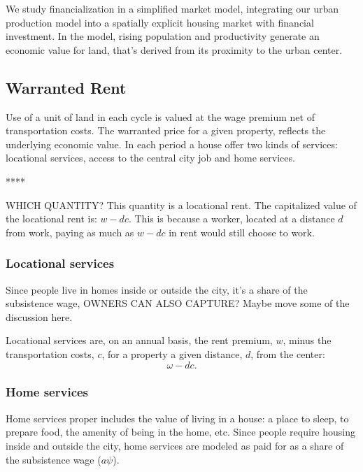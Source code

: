 We study \gls{financialization} in a simplified market model, integrating
our urban production model  into a spatially explicit {housing market} with financial investment. %
In the model, rising \gls{population} and \gls{productivity} generate an economic value for land, that's derived from its proximity to the \gls{urban center}. 


\subsection{Warranted Rent} \label{section-warranted-rent}

Use of a unit of land in each cycle is valued at the wage premium net of transportation costs. 
The warranted price for a given property, reflects the underlying economic value. In each period a house offer two kinds of services: \gls{locational services}, access to the central city job and \gls{home services}.  


****

WHICH QUANTITY?
This quantity is a locational rent. The capitalized value of the locational rent is:  $w-{dc}$. This is because a worker, located at a distance $d$ from work, paying as much as $w-{dc}$ in rent would still choose to work. 


\subsubsection{Locational services}
Since people live in homes inside or outside the city, it's a share of the subsistence wage,  OWNERS CAN ALSO CAPTURE? Maybe move some of the discussion here.

Locational services are, on an annual basis, the rent premium, $w$, minus the transportation costs, $c$, for a property a given distance, $d$, from the center:
\[\omega- {dc}.\]

\subsubsection{Home services}
Home services proper includes the value of living in a house: a place to sleep, to prepare food, the amenity of being in the home, etc. Since people require housing inside and outside the city, home services are modeled as paid for as a share of the subsistence wage ($a \psi$). 

